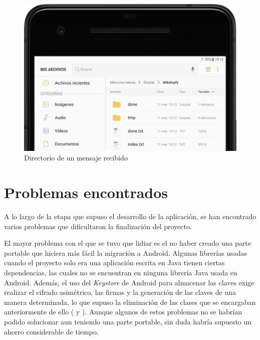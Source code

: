 \begin{figure}[!htb]
  \centering
  \includegraphics[scale=0.4]{Figures/done}
  \decoRule
  \caption[Shatter (Mensaje recibido)]{Directorio de un mensaje recibido}
  \label{fig:done}
\end{figure}


\section{Problemas encontrados}

\label{Chapter5.2}

A lo largo de la etapa que supuso el desarrollo de la aplicación, se han encontrado varios problemas que dificultaron la finalización del proyecto.

El mayor problema con el que se tuvo que lidiar es el no haber creado una parte portable que hiciera más fácil la migración a Android. Algunas librerías usadas cuando el proyecto solo era una aplicación escrita en Java tienen ciertas dependencias, las cuales no se encuentran en ninguna librería Java usada en Android. Además, el uso del \emph{Keystore} de Android para almacenar las claves exige realizar el cifrado asimétrico, las firmas y la generación de las claves de una manera determinada, lo que supuso la eliminación de las clases que se encargaban anteriormente de ello ( y ). Aunque algunos de estos problemas no se habrían podido solucionar aun teniendo una parte portable, sin duda habría supuesto un ahorro considerable de tiempo.

